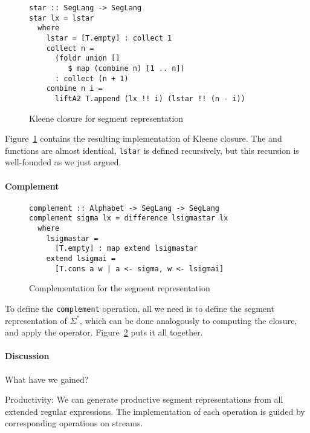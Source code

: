\begin{figure}[tp]
\begin{lstlisting}
star :: SegLang -> SegLang
star lx = lstar
  where
    lstar = [T.empty] : collect 1
    collect n =
      (foldr union [] 
         $ map (combine n) [1 .. n])
      : collect (n + 1)
    combine n i =
      liftA2 T.append (lx !! i) (lstar !! (n - i))
\end{lstlisting}
\vspace{-\baselineskip}
  \caption{Kleene closure for segment representation}
  \label{fig:star-with-segments}
\end{figure}
Figure~\ref{fig:star-with-segments} contains the resulting implementation of Kleene closure.
The  and  functions are almost
identical, \lstinline{lstar} is defined recursively, but this recursion is well-founded as
we just argued. 

\paragraph{Complement}
\begin{figure}[tp]
\begin{lstlisting}
complement :: Alphabet -> SegLang -> SegLang
complement sigma lx = difference lsigmastar lx
  where
    lsigmastar =
      [T.empty] : map extend lsigmastar
    extend lsigmai =
      [T.cons a w | a <- sigma, w <- lsigmai]
\end{lstlisting}
\vspace{-\baselineskip}
  \caption{Complementation for the segment representation}
  \label{fig:llo-complement}
\end{figure}
To define the \lstinline{complement} operation, all we need is to define the segment
representation of $\Sigma^*$, which can be done analogously to computing the closure, and
apply the  operator. Figure~\ref{fig:llo-complement} puts it all together.

\paragraph{Discussion}\label{sec:motivation-discussion}
What have we gained?

Productivity: We can generate productive segment
representations from all extended regular expressions. The implementation of each
operation is guided by corresponding operations on streams.

